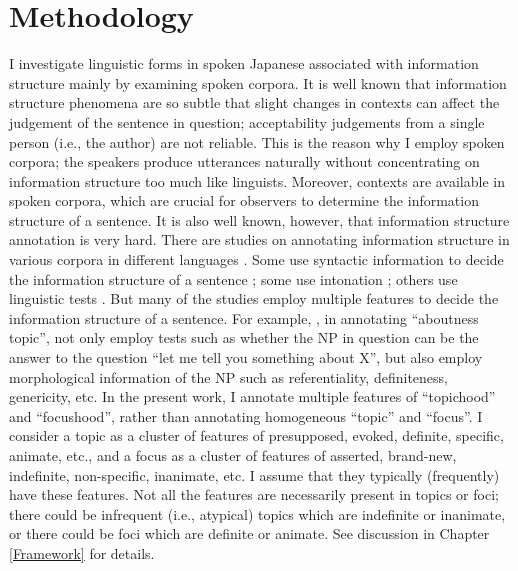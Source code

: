 \section{Methodology}\label{IntroMethodology}

I investigate linguistic forms in spoken Japanese associated with
information structure
mainly by examining spoken corpora.
It is well known that information structure phenomena are so subtle
that slight changes in contexts can affect the judgement of the sentence in question;
acceptability judgements from a single person (i.e., the author) are not reliable.
This is the reason why I employ spoken corpora;
the speakers produce utterances naturally without concentrating on information structure too much like linguists.
Moreover, contexts are available in spoken corpora,
which are crucial for observers to determine the information structure of a sentence.
It is also well known, however,
that information structure annotation is very hard.
There are studies on annotating information structure in various corpora in different languages
\cite{hajicovaetal00,calhounetal05,gotzeetal07,ritzetal08,chiarcosetal11}.
Some use syntactic information to decide the information structure of a sentence \cite{hajicovaetal00};
some use intonation \cite{calhounetal05};
others use linguistic tests \cite{gotzeetal07,chiarcosetal11}.
But many of the studies employ multiple features to decide the information structure of a sentence.
For example,
,
in annotating ``aboutness topic'',
not only employ tests such as whether the NP in question can be the answer to the question ``let me tell you something about X'',
but also employ morphological information of the NP
such as referentiality, definiteness, genericity, etc.
In the present work, I annotate multiple features of ``topichood'' and ``focushood'',
rather than annotating homogeneous ``topic'' and ``focus''.
I consider a topic as a cluster of features of presupposed, evoked, definite, specific, animate, etc.,
and a focus as a cluster of features of asserted, brand-new, indefinite, non-specific, inanimate, etc.
I assume that they typically (frequently) have these features.
Not all the features are necessarily present in topics or foci;
there could be infrequent (i.e., atypical) topics which are indefinite or inanimate,
or there could be foci which are definite or animate.
See discussion in Chapter \ref{Framework} for details.

